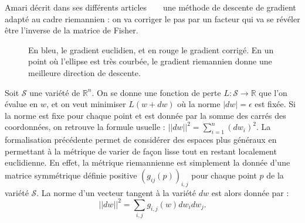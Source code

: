 \documentclass{article}
\theoremstyle{definition}
\newcommand{\R}{\mathbb R}
\begin{document}
\noindent Amari décrit dans ses différents articles ~\cite{Amari1994} ~\cite{Amari1998} une méthode de descente de gradient adapté au cadre riemannien : on va corriger le pas par un facteur qui va se révéler être l'inverse de la matrice de Fisher. %

\begin{figure}[h!]
\label{ellipse}
\caption{En bleu, le gradient euclidien, et en rouge le gradient corrigé. En un point où l'ellipse est très courbée, le gradient riemannien donne une meilleure direction de descente.}
\end{figure}

\noindent Soit $\mathcal{S}$ une variété de $\R^n$. On se donne une fonction de perte $L : \mathcal S \rightarrow \R$ que l'on évalue en $w$, et on veut minimiser $L(w+dw)$ où la norme $|dw|=\epsilon$ est fixée. 
Si la norme est fixe pour chaque point et est donnée par la somme des carrés des coordonnées, on retrouve la formule usuelle :
$||dw||^2=\displaystyle \sum_{i=1}^n (dw_i)^2$. La formalisation précédente permet de considérer des espaces plus généraux en permettant à la métrique de varier de façon lisse tout en restant localement euclidienne. En effet, la métrique riemannienne est simplement la donnée d'une matrice symmétrique définie positive $(g_{ij}(p))_{i,j}$ pour chaque point $p$ de la variété $\mathcal{S}$. 
La norme d'un vecteur tangent à la variété $dw$ est alors donnée par :
\[||dw||^2=\displaystyle \sum_{i,j} g_{i,j}(w) dw_i dw_j.\]
\end{document}
